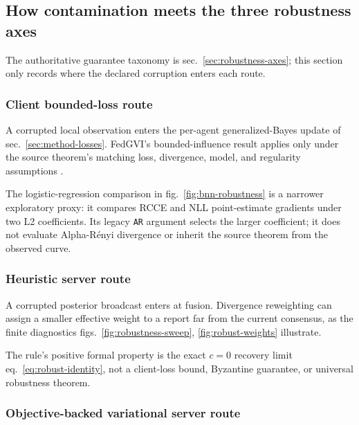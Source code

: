 \documentclass[
  english,
]{article}
\theoremstyle{plain}
\theoremstyle{definition}
\theoremstyle{remark}
\theoremstyle{definition}
\begin{document}
\subsection{How contamination meets the three robustness
axes}\label{sec:methods-contamination-axes}

The authoritative guarantee taxonomy is sec.~\ref{sec:robustness-axes};
this section only records where the declared corruption enters each
route.

\subsubsection{Client bounded-loss
route}\label{sec:methods-contamination-client}

A corrupted local observation enters the per-agent generalized-Bayes
update of sec.~\ref{sec:method-losses}. FedGVI's bounded-influence
result applies only under the source theorem's matching loss,
divergence, model, and regularity assumptions \citep{mildner2025fedgvi}.

The logistic-regression comparison in fig.~\ref{fig:bnn-robustness} is a
narrower exploratory proxy: it compares RCCE and NLL point-estimate
gradients under two L2 coefficients. Its legacy \texttt{AR} argument
selects the larger coefficient; it does not evaluate Alpha-Rényi
divergence or inherit the source theorem from the observed curve.

\subsubsection{Heuristic server
route}\label{sec:methods-contamination-heuristic-server}

A corrupted posterior broadcast enters  at
fusion. Divergence reweighting can assign a smaller effective weight to
a report far from the current consensus, as the finite diagnostics
figs.~\ref{fig:robustness-sweep}, \ref{fig:robust-weights} illustrate.

The rule's positive formal property is the exact \(c=0\) recovery limit
eq.~\ref{eq:robust-identity}, not a client-loss bound, Byzantine
guarantee, or universal robustness theorem.

\subsubsection{Objective-backed variational server
route}\label{sec:methods-contamination-variational-server}
\end{document}
